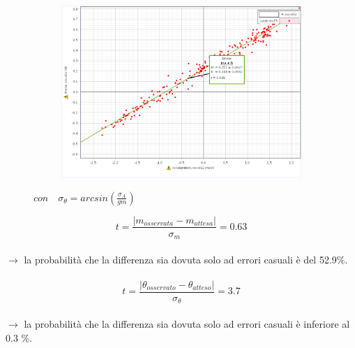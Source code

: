 \documentclass[a4paper]{article}
\theoremstyle{definition}
\begin{document}
\begin{figure}[!htbp]
{{			\begin{subfigure}{0.9\textwidth}
				\includegraphics[scale=0.45]{capstone_data/incl5.png}
			\end{subfigure}%
		}
	}
\end{figure}
\begin{figure}[!htbp]
		\captionsetup{labelformat=empty}
	\caption{\(\bar{m} = 0.252 \pm 0.001\quad \bar{\theta} =  -4.89 \pm 0.03^{\circ}\)}
\caption{\( con \quad \sigma_{\theta} = arcsin(\frac{\sigma_{A}}{gm})\)}
\end{figure}
\[t = \frac{\left | m_{osservata} - m_{attesa} \right |}{\sigma_{m}}= 0.63\]\\

\noindent \(\rightarrow\) la probabilità che la differenza sia dovuta solo ad errori casuali è del 52.9\(\%\).\\\\
\[t = \frac{\left | \theta_{osservato} - \theta_{atteso} \right |}{\sigma_{\theta}}= 3.7\]\\
\noindent \(\rightarrow\) la probabilità che la differenza sia dovuta solo ad errori casuali è inferiore al 0.3 \(\%\).
\end{document}
